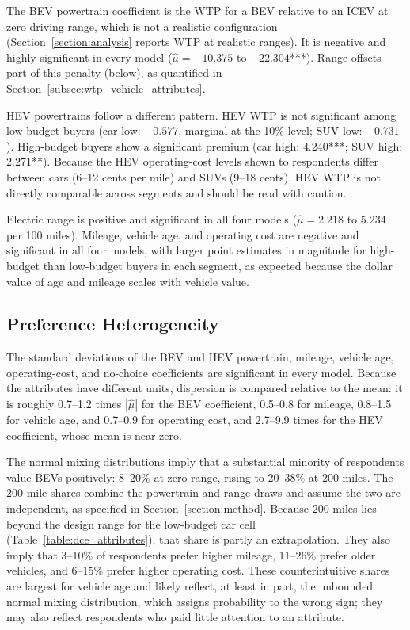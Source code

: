 \documentclass[a4paper,fleqn]{cas-sc}   %
\begin{document}
The BEV powertrain coefficient is the WTP for a BEV relative to an ICEV at zero driving range, which is not a realistic configuration (Section~\ref{section:analysis} reports WTP at realistic ranges). It is negative and highly significant in every model ($\hat{\mu} = -10.375$ to $-22.304$***). Range offsets part of this penalty (below), as quantified in Section~\ref{subsec:wtp_vehicle_attributes}.

HEV powertrains follow a different pattern. HEV WTP is not significant among low-budget buyers (car low: $-0.577$, marginal at the 10\% level; SUV low: $-0.731$). High-budget buyers show a significant premium (car high: $4.240$***; SUV high: $2.271$**). Because the HEV operating-cost levels shown to respondents differ between cars (6--12 cents per mile) and SUVs (9--18 cents), HEV WTP is not directly comparable across segments and should be read with caution.

Electric range is positive and significant in all four models ($\hat{\mu} = 2.218$ to $5.234$ per 100 miles). Mileage, vehicle age, and operating cost are negative and significant in all four models, with larger point estimates in magnitude for high-budget than low-budget buyers in each segment, as expected because the dollar value of age and mileage scales with vehicle value.

\subsection{Preference Heterogeneity}
\label{subsec:mxl_heterogeneity}

The standard deviations of the BEV and HEV powertrain, mileage, vehicle age, operating-cost, and no-choice coefficients are significant in every model. Because the attributes have different units, dispersion is compared relative to the mean: it is roughly 0.7--1.2 times $|\hat{\mu}|$ for the BEV coefficient, 0.5--0.8 for mileage, 0.8--1.5 for vehicle age, and 0.7--0.9 for operating cost, and 2.7--9.9 times for the HEV coefficient, whose mean is near zero.

The normal mixing distributions imply that a substantial minority of respondents value BEVs positively: 8--20\% at zero range, rising to 20--38\% at 200 miles. The 200-mile shares combine the powertrain and range draws and assume the two are independent, as specified in Section~\ref{section:method}. Because 200 miles lies beyond the design range for the low-budget car cell (Table~\ref{table:dce_attributes}), that share is partly an extrapolation. They also imply that 3--10\% of respondents prefer higher mileage, 11--26\% prefer older vehicles, and 6--15\% prefer higher operating cost. These counterintuitive shares are largest for vehicle age and likely reflect, at least in part, the unbounded normal mixing distribution, which assigns probability to the wrong sign; they may also reflect respondents who paid little attention to an attribute.
\end{document}
